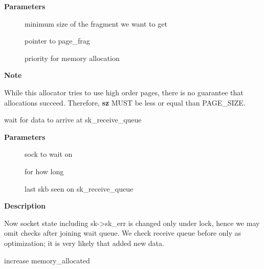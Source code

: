 \documentclass[a4paper,8pt,english]{sphinxmanual}
\begin{document}
\textbf{Parameters}
\begin{description}
\item[{}] \leavevmode
minimum size of the fragment we want to get

\item[{}] \leavevmode
pointer to page\_frag

\item[{}] \leavevmode
priority for memory allocation

\end{description}

\textbf{Note}

While this allocator tries to use high order pages, there is
no guarantee that allocations succeed. Therefore, \textbf{sz} MUST be
less or equal than PAGE\_SIZE.

\begin{fulllineitems}
\label{networking/kapi:c.sk_wait_data}
wait for data to arrive at sk\_receive\_queue

\end{fulllineitems}


\textbf{Parameters}
\begin{description}
\item[{}] \leavevmode
sock to wait on

\item[{}] \leavevmode
for how long

\item[{}] \leavevmode
last skb seen on sk\_receive\_queue

\end{description}

\textbf{Description}

Now socket state including sk-\textgreater{}sk\_err is changed only under lock,
hence we may omit checks after joining wait queue.
We check receive queue before  only as optimization;
it is very likely that  added new data.

\begin{fulllineitems}
\label{networking/kapi:c.__sk_mem_raise_allocated}
increase memory\_allocated

\end{fulllineitems}
\end{document}
